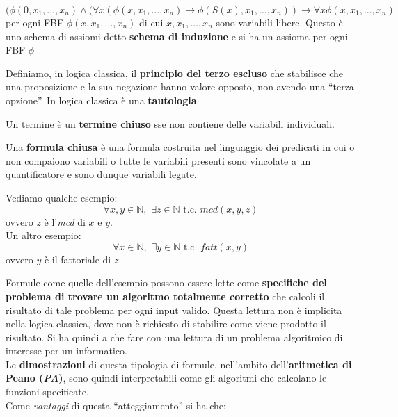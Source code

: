 \documentclass[a4paper,12pt, oneside]{book}
\begin{document}
\begin{shaded}
\begin{definizione}
    {\footnotesize{\[(\phi(0,x_1,\ldots,x_n)\land(\forall
      x(\phi(x,x_1,\ldots,x_n)\to\phi(S(x),x_1,\ldots,x_n))\to\forall 
      x\phi(x,x_1,\ldots,x_n)\]}}
    per ogni FBF $\phi(x,x_1,\ldots,x_n)$ di cui
    $x,x_1,\ldots,x_n$ sono variabili libere. Questo è uno schema di assiomi
    detto \textbf{schema di induzione} e si ha un assioma per ogni FBF
    $\phi$ 
  \end{definizione}
  \begin{definizione}
    Definiamo, in logica classica, il \textbf{principio del terzo escluso} che
    stabilisce che una proposizione e la sua negazione hanno valore opposto, non
    avendo una ``terza opzione''. In logica classica è una \textbf{tautologia}.
  \end{definizione}
  \begin{definizione}
    Un termine è un \textbf{termine chiuso} sse non contiene delle variabili
    individuali.  
  \end{definizione}
  \begin{definizione}
    Una \textbf{formula chiusa} è una formula costruita nel linguaggio dei
    predicati in cui o non compaiono variabili o tutte le variabili presenti
    sono vincolate a un quantificatore e sono dunque variabili legate. 
  \end{definizione}
\end{shaded}
\begin{esempio}
  Vediamo qualche esempio:
  \[\forall x,y\in\mathbb{N},\,\,\exists z\in\mathbb{N}\mbox{ t.c. }
    mcd(x,y,z)\]
  ovvero $z$ è l'\textit{mcd} di $x$ e $y$.\\
  Un altro esempio:
  \[\forall x\in \mathbb{N},\,\,\exists y\in \mathbb{N}\mbox{ t.c. }
    fatt(x,y)\]
  ovvero $y$ è il fattoriale di $z$.
\end{esempio}
Formule come quelle dell'esempio possono essere lette come \textbf{specifiche
  del problema di trovare un algoritmo totalmente corretto} che calcoli il
risultato di tale problema per ogni input valido. Questa lettura non è implicita
nella logica classica, dove non è richiesto di stabilire come viene prodotto il
risultato. Si ha quindi a che fare con una lettura di un problema algoritmico di
interesse per un informatico.\\
Le \textbf{dimostrazioni} di questa tipologia di formule, nell'ambito
dell'\textbf{aritmetica di Peano (\textit{PA})}, sono quindi interpretabili come
gli algoritmi che calcolano le funzioni specificate. \\
Come \textit{vantaggi} di questa ``atteggiamento'' si ha che:
\end{document}
